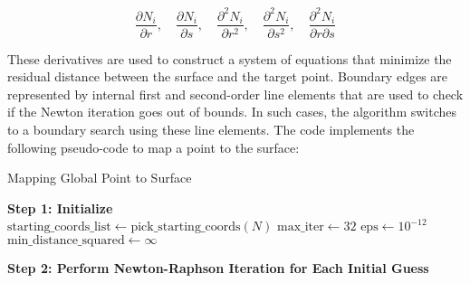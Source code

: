 \[
\frac{\partial N_i}{\partial r}, \quad \frac{\partial N_i}{\partial s}, \quad \frac{\partial^2 N_i}{\partial r^2}, \quad \frac{\partial^2 N_i}{\partial s^2}, \quad \frac{\partial^2 N_i}{\partial r \partial s}
\]

These derivatives are used to construct a system of equations that minimize the residual distance between the surface and the target point. Boundary edges are represented by internal first and second-order line elements that are used to check if the Newton iteration goes out of bounds. In such cases, the algorithm switches to a boundary search using these line elements.
The code implements the following pseudo-code to map a point to the surface:

\begin{algorithm}[H]
\caption{Mapping Global Point to Surface}
\BlankLine
\textbf{Step 1: Initialize} \\
$\text{starting\_coords\_list} \gets \text{pick\_starting\_coords}(N)$ \;
$\text{max\_iter} \gets 32$ \;
$\text{eps} \gets 10^{-12}$ \;
$\text{min\_distance\_squared} \gets \infty$ \;

\BlankLine
\textbf{Step 2: Perform Newton-Raphson Iteration for Each Initial Guess} \\
\end{algorithm}
